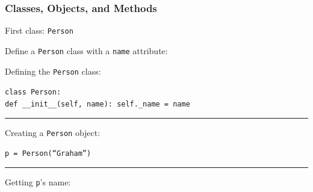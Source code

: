 \documentclass{beamer}
\newcommand{\code}[1]{\texttt{#1}}
\newcommand{\tab}{\hspace*{22pt}}
\begin{document}
\begin{frame}	
	\frametitle{Classes, Objects, and Methods}
	
	\begin{block}{First class: \code{Person}}
		\begin{scriptsize}
		Define a \code{Person} class with a \code{name} attribute:
		
		\vspace{15pt}
			Defining the \code{Person} class:
		
			\vspace{10pt}
			\code{class Person: \\
					\tab def \_\_init\_\_(self, name):
					\tab \tab self.\_name = name
			}
			
			\rule[0pt]{\linewidth}{1pt}
		
			\vspace{10pt}
			Creating a \code{Person} object:
			
			\vspace{10pt}
			\code{p = Person(``Graham'')
			}
			
			\rule[0pt]{\linewidth}{1pt}
		
			\vspace{10pt}
			Getting \code{p}'s name:
			

\end{scriptsize}
\end{block}
\end{frame}
\end{document}
